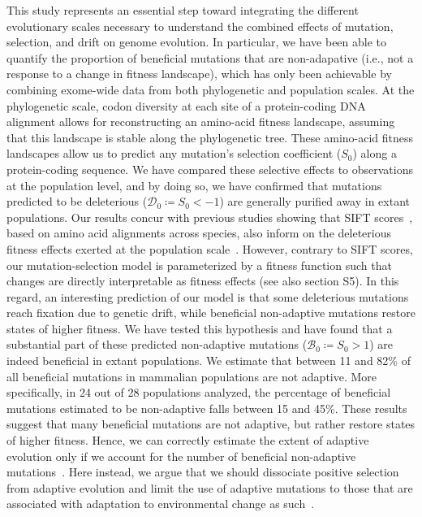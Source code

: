 \documentclass[10pt,letterpaper]{article}
\newcommand{\Sphy}{S_{0}}
\newcommand{\SphyDel}{\mathcal{D}_0}
\newcommand{\SphyBen}{\mathcal{B}_0}
\begin{document}
This study represents an essential step toward integrating the different evolutionary scales necessary to understand the combined effects of mutation, selection, and drift on genome evolution.
In particular, we have been able to quantify the proportion of beneficial mutations that are non-adapative (i.e., not a response to a change in fitness landscape), which has only been achievable by combining exome-wide data from both phylogenetic and population scales.
At the phylogenetic scale, codon diversity at each site of a protein-coding DNA alignment allows for reconstructing an amino-acid fitness landscape, assuming that this landscape is stable along the phylogenetic tree.
These amino-acid fitness landscapes allow us to predict any mutation’s selection coefficient ($\Sphy$) along a protein-coding sequence.
We have compared these selective effects to observations at the population level, and by doing so, we have confirmed that mutations predicted to be deleterious ($\SphyDel \coloneqq \Sphy < -1$) are generally purified away in extant populations.
Our results concur with previous studies showing that SIFT scores~\cite{ng_sift_2003, vaser_sift_2016}, based on amino acid alignments across species, also inform on the deleterious fitness effects exerted at the population scale~\cite{chen_hunting_2021}.
However, contrary to SIFT scores, our mutation-selection model is parameterized by a fitness function such that changes are directly interpretable as fitness effects (see also section S5).
In this regard, an interesting prediction of our model is that some deleterious mutations reach fixation due to genetic drift, while beneficial non-adaptive mutations restore states of higher fitness.
We have tested this hypothesis and have found that a substantial part of these predicted non-adaptive mutations ($\SphyBen \coloneqq \Sphy > 1 $) are indeed beneficial in extant populations.
We estimate that between 11 and 82\% of all beneficial mutations in mammalian populations are not adaptive.
More specifically, in 24 out of 28 populations analyzed, the percentage of beneficial mutations estimated to be non-adaptive falls between 15 and 45\%.
These results suggest that many beneficial mutations are not adaptive, but rather restore states of higher fitness.
Hence, we can correctly estimate the extent of adaptive evolution only if we account for the number of beneficial non-adaptive mutations~\cite{keightley_what_2010, rice_evolutionarily_2015}.
Here instead, we argue that we should dissociate positive selection from adaptive evolution and limit the use of adaptive mutations to those that are associated with adaptation to environmental change as such~\cite{charlesworth_other_2007, mustonen_fitness_2009, mustonen_fitness_2010}.
\end{document}

